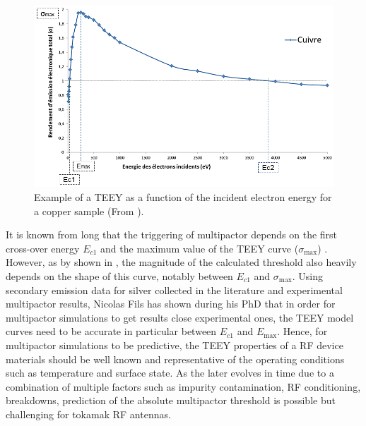 \begin{figure}[h]
	\centering
	\includegraphics[width=1.0\linewidth]{figures/chap4/TEEY_Cu_example}
	\caption{Example of a TEEY as a function of the incident electron energy for a copper sample (From ).}
	\label{fig:teeycuexample}
\end{figure}

It is known from long that the triggering of multipactor depends on the first cross-over energy  $E_{c1}$ and the maximum value of the TEEY curve ($\sigma_{\max}$) . However, as by shown in , the magnitude of the calculated threshold also heavily depends on the shape of this curve, notably between $E_{c1}$ and $\sigma_{\max}$. Using secondary emission data for silver collected in the literature and experimental multipactor results, Nicolas Fils has shown during his PhD that in order for multipactor simulations to get results close experimental ones, the TEEY model curves need to be accurate in particular between $E_{c1}$ and $E_{\max}$. Hence, for multipactor simulations to be predictive, the TEEY properties of a RF device materials should be well known and representative of the operating conditions such as temperature and surface state. As the later evolves in time due to a combination of multiple factors such as impurity contamination, RF conditioning, breakdowns, prediction of the absolute multipactor threshold is possible but challenging for tokamak RF antennas.


